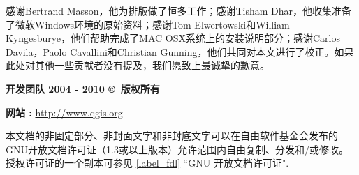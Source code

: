 感谢Bertrand Masson，他为排版做了恒多工作；感谢Tisham Dhar，他收集准备了微软Windows环境的原始资料；感谢Tom Elwertowski和William Kyngesburye，他们帮助完成了MAC OSX系统上的安装说明部分；感谢Carlos Davila，Paolo
Cavallini和Christian Gunning，他们共同对本文进行了校正。如果此处对其他一些贡献者没有提及，我们愿致上最诚挚的歉意。
\par\bigskip\noindent
\textbf{\QG 开发团队 2004 - 2010 \copyright~版权所有}
\par\bigskip\noindent
\textbf{网站 :} \url{http://www.qgis.org}


本文档的非固定部分、非封面文字和非封底文字可以在自由软件基金会发布的GNU开放文档许可证（1.3或以上版本）允许范围内自由复制、分发和/或修改。授权许可证的一个副本可参见 \ref{label_fdl} “GNU 开放文档许可证".

\newpage
